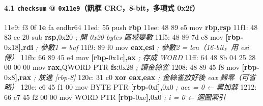 \documentclass[10pt,a4paper]{article}
\newenvironment{Shaded}{\begin{snugshade}}{\end{snugshade}}
\newcommand{\BaseNTok}[1]{\textcolor[rgb]{0.00,0.00,0.81}{#1}}
\newcommand{\BuiltInTok}[1]{#1}
\newcommand{\CommentTok}[1]{\textcolor[rgb]{0.56,0.35,0.01}{\textit{#1}}}
\newcommand{\DataTypeTok}[1]{\textcolor[rgb]{0.13,0.29,0.53}{#1}}
\newcommand{\DecValTok}[1]{\textcolor[rgb]{0.00,0.00,0.81}{#1}}
\newcommand{\ErrorTok}[1]{\textcolor[rgb]{0.64,0.00,0.00}{\textbf{#1}}}
\newcommand{\FloatTok}[1]{\textcolor[rgb]{0.00,0.00,0.81}{#1}}
\newcommand{\KeywordTok}[1]{\textcolor[rgb]{0.13,0.29,0.53}{\textbf{#1}}}
\newcommand{\NormalTok}[1]{#1}
\newcommand{\OperatorTok}[1]{\textcolor[rgb]{0.81,0.36,0.00}{\textbf{#1}}}
\renewenvironment{Shaded}{%
  \def\FrameCommand{\fboxsep=3.2pt\colorbox{shadecolor}}%
  \MakeFramed{\advance\hsize-\width\FrameRestore\small}%
}{%
  \endMakeFramed
}
\begin{document}
\paragraph{\texorpdfstring{4.1 \texttt{checksum} @ \texttt{0x11e9}（訊框
CRC，8-bit，多項式
0x2f）}{4.1 checksum @ 0x11e9（訊框 CRC，8-bit，多項式 0x2f）}}\label{checksum-0x11e9ux8a0aux6846-crc8-bitux591aux9805ux5f0f-0x2f}

\begin{Shaded}
\begin{Highlighting}[]
\NormalTok{11e9: f3 }\FloatTok{0}\BaseNTok{f} \DecValTok{1}\ErrorTok{e}\NormalTok{ fa            endbr64}
\NormalTok{11ed: 55                     }\BuiltInTok{push}   \KeywordTok{rbp}
\NormalTok{11ee: 48 89 e5               mov    }\KeywordTok{rbp}\OperatorTok{,}\KeywordTok{rsp}
\NormalTok{11f1: 48 83 ec }\DecValTok{20}\NormalTok{            sub    }\KeywordTok{rsp}\OperatorTok{,}\BaseNTok{0x20}              \CommentTok{; 開 0x20 bytes 區域變數}
\NormalTok{11f5: 48 89 7d e8            mov    }\OperatorTok{[}\KeywordTok{rbp}\OperatorTok{{-}}\BaseNTok{0x18}\OperatorTok{],}\KeywordTok{rdi}        \CommentTok{; 參數1 = buf}
\NormalTok{11f9: 89 f0                  mov    }\KeywordTok{eax}\OperatorTok{,}\KeywordTok{esi}               \CommentTok{; 參數2 = len（16{-}bit，用 esi 傳）}
\NormalTok{11fb: 66 89 45 e4            mov    }\OperatorTok{[}\KeywordTok{rbp}\OperatorTok{{-}}\BaseNTok{0x1c}\OperatorTok{],}\KeywordTok{ax}         \CommentTok{; 存成 WORD}
\NormalTok{11ff: 64 48 8b 04 25 28 00 00 00   }\BuiltInTok{mov} \KeywordTok{rax}\OperatorTok{,}\DataTypeTok{QWORD} \DataTypeTok{PTR} \KeywordTok{fs}\OperatorTok{:}\BaseNTok{0x28}   \CommentTok{; 讀金絲雀}
\NormalTok{1208: 48 89 45 f8            mov    }\OperatorTok{[}\KeywordTok{rbp}\OperatorTok{{-}}\BaseNTok{0x8}\OperatorTok{],}\KeywordTok{rax}         \CommentTok{; 放進 [rbp{-}8]}
\NormalTok{120c: 31 c0                  }\OperatorTok{xor}    \KeywordTok{eax}\OperatorTok{,}\KeywordTok{eax}               \CommentTok{; 金絲雀放好後 eax 歸零（可省略）}
\NormalTok{120e: c6 }\DecValTok{45}\NormalTok{ f1 }\DecValTok{00}\NormalTok{            mov    }\DataTypeTok{BYTE} \DataTypeTok{PTR} \OperatorTok{[}\KeywordTok{rbp}\OperatorTok{{-}}\BaseNTok{0xf}\OperatorTok{],}\BaseNTok{0x0} \CommentTok{; acc = 0        ← 累加器}
\NormalTok{1212: 66 c7 }\DecValTok{45}\NormalTok{ f2 }\DecValTok{00} \DecValTok{00}\NormalTok{      mov    }\DataTypeTok{WORD} \DataTypeTok{PTR} \OperatorTok{[}\KeywordTok{rbp}\OperatorTok{{-}}\BaseNTok{0xe}\OperatorTok{],}\BaseNTok{0x0} \CommentTok{; i = 0          ← 迴圈索引}

\end{Highlighting}
\end{Shaded}
\end{document}
